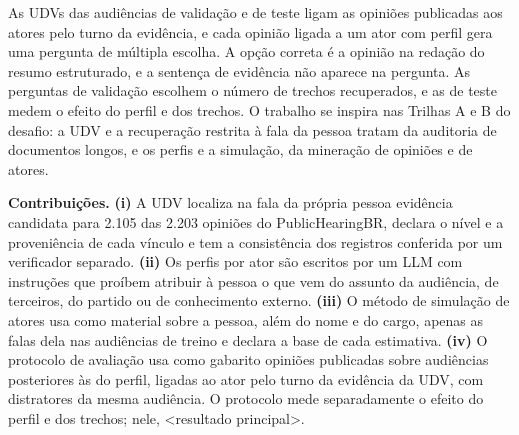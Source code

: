 As UDVs das audiências de validação e de teste ligam as opiniões publicadas aos atores pelo turno da
evidência, e cada opinião ligada a um ator com perfil gera uma pergunta de múltipla escolha. A opção
correta é a opinião na redação do resumo estruturado, e a sentença de evidência não aparece na
pergunta. As perguntas de validação escolhem o número de trechos recuperados, e as de teste medem o
efeito do perfil e dos trechos. O trabalho se inspira nas Trilhas A e B do desafio: a UDV e a
recuperação restrita à fala da pessoa tratam da auditoria de documentos longos, e os perfis e a
simulação, da mineração de opiniões e de atores.

\medskip\noindent\textbf{Contribui\c{c}\~oes.} \textbf{(i)} A UDV localiza na fala da própria pessoa
evidência candidata para 2.105 das 2.203 opiniões do PublicHearingBR, declara o nível e a
proveniência de cada vínculo e tem a consistência dos registros conferida por um verificador
separado. \textbf{(ii)} Os perfis por ator são escritos por um LLM com instruções que proíbem
atribuir à pessoa o que vem do assunto da audiência, de terceiros, do partido ou de conhecimento
externo. \textbf{(iii)} O método de simulação de atores usa como material sobre a pessoa, além do nome e
do cargo, apenas as falas dela nas audiências de treino e declara a base de cada estimativa.
\textbf{(iv)} O protocolo de avaliação usa como gabarito opiniões publicadas sobre
audiências posteriores às do perfil, ligadas ao ator pelo turno da evidência da UDV, com distratores
da mesma audiência. O protocolo mede separadamente o efeito do perfil e dos trechos; nele,
<resultado principal>.
